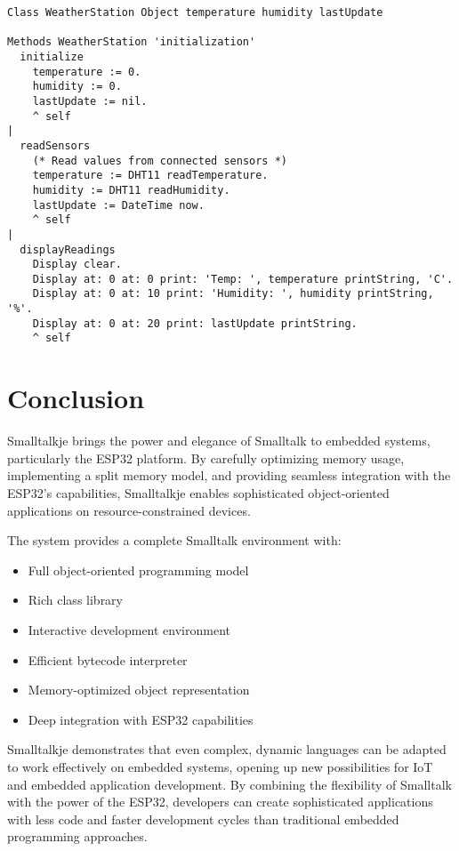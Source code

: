 \documentclass[12pt,a4paper]{report}
\begin{document}
\begin{lstlisting}[style=smalltalk]
Class WeatherStation Object temperature humidity lastUpdate

Methods WeatherStation 'initialization'
  initialize
    temperature := 0.
    humidity := 0.
    lastUpdate := nil.
    ^ self
|
  readSensors
    (* Read values from connected sensors *)
    temperature := DHT11 readTemperature.
    humidity := DHT11 readHumidity.
    lastUpdate := DateTime now.
    ^ self
|
  displayReadings
    Display clear.
    Display at: 0 at: 0 print: 'Temp: ', temperature printString, 'C'.
    Display at: 0 at: 10 print: 'Humidity: ', humidity printString, '%'.
    Display at: 0 at: 20 print: lastUpdate printString.
    ^ self
\end{lstlisting}

\chapter{Conclusion}

Smalltalkje brings the power and elegance of Smalltalk to embedded systems, particularly the ESP32 platform. By carefully optimizing memory usage, implementing a split memory model, and providing seamless integration with the ESP32's capabilities, Smalltalkje enables sophisticated object-oriented applications on resource-constrained devices.

The system provides a complete Smalltalk environment with:

\begin{itemize}
    \item Full object-oriented programming model
    \item Rich class library
    \item Interactive development environment
    \item Efficient bytecode interpreter
    \item Memory-optimized object representation
    \item Deep integration with ESP32 capabilities
\end{itemize}

Smalltalkje demonstrates that even complex, dynamic languages can be adapted to work effectively on embedded systems, opening up new possibilities for IoT and embedded application development. By combining the flexibility of Smalltalk with the power of the ESP32, developers can create sophisticated applications with less code and faster development cycles than traditional embedded programming approaches.
\end{document}
